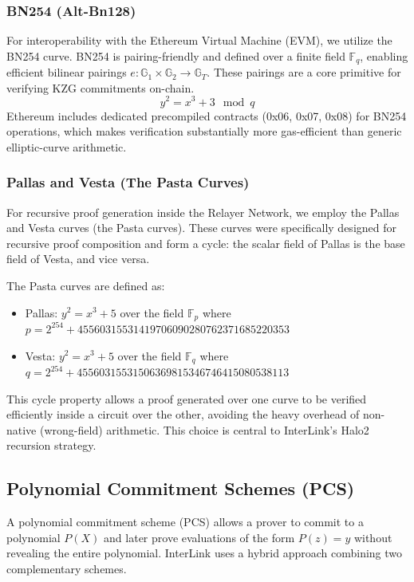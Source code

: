\documentclass[11pt,a4paper]{article}
\begin{document}
\subsubsection{BN254 (Alt-Bn128)}
For interoperability with the Ethereum Virtual Machine (EVM), we utilize the BN254 curve. BN254 is pairing-friendly and defined over a finite field $\mathbb{F}_q$, enabling efficient bilinear pairings $e: \mathbb{G}_1 \times \mathbb{G}_2 \rightarrow \mathbb{G}_T$. These pairings are a core primitive for verifying KZG commitments on-chain.
$$ y^2 = x^3 + 3 \mod q $$
Ethereum includes dedicated precompiled contracts (0x06, 0x07, 0x08) for BN254 operations, which makes verification substantially more gas-efficient than generic elliptic-curve arithmetic.

\subsubsection{Pallas and Vesta (The Pasta Curves)}
For recursive proof generation inside the Relayer Network, we employ the Pallas and Vesta curves (the Pasta curves). These curves were specifically designed for recursive proof composition and form a cycle: the scalar field of Pallas is the base field of Vesta, and vice versa.

The Pasta curves are defined as:
\begin{itemize}
    \item Pallas: $y^2 = x^3 + 5$ over the field $\mathbb{F}_p$ where $p = 2^{254} + 45560315531419706090280762371685220353$
    \item Vesta: $y^2 = x^3 + 5$ over the field $\mathbb{F}_q$ where $q = 2^{254} + 45560315531506369815346746415080538113$
\end{itemize}

This cycle property allows a proof generated over one curve to be verified efficiently inside a circuit over the other, avoiding the heavy overhead of non-native (wrong-field) arithmetic. This choice is central to InterLink's Halo2 recursion strategy.

\subsection{Polynomial Commitment Schemes (PCS)}
A polynomial commitment scheme (PCS) allows a prover to commit to a polynomial $P(X)$ and later prove evaluations of the form $P(z)=y$ without revealing the entire polynomial. InterLink uses a hybrid approach combining two complementary schemes.
\end{document}

